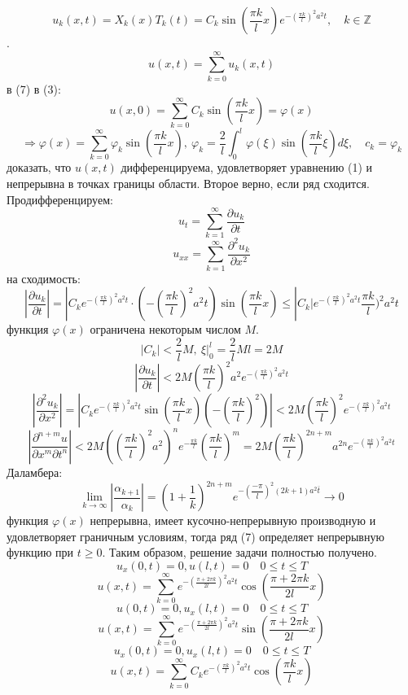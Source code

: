 \documentclass[9pt]{article}
\begin{document}
\[u_k(x,t)=X_k(x)T_k(t)=C_k\sin(\dfrac{\pi k}{l}x)e^{-(\frac{\pi k}{l})^2a^2t},\quad k\in\mathbb Z\].
\begin{equation}
    u(x,t)=\displaystyle\sum_{k=0}^\infty u_k(x,t)
\end{equation}
 в (7) в (3):
\[u(x,0)=\displaystyle\sum_{k=0}^\infty C_k\sin(\dfrac{\pi k}{l}x)=\varphi(x)\]
\[\Rightarrow\varphi(x)=\displaystyle\sum_{k=0}^\infty\varphi_k\sin(\dfrac{\pi k}{l}x),\ \varphi_k=\dfrac{2}{l}\int_0^l\varphi(\xi)\sin(\dfrac{\pi k}{l}\xi)d\xi,\quad c_k=\varphi_k\]
 доказать, что \(u(x,t)\) дифференцируема, удовлетворяет уравнению (1) и непрерывна в точках границы области. Второе верно, если ряд сходится. Продифференцируем: \[u_t=\displaystyle\sum_{k=1}^\infty \dfrac{\partial u_k}{\partial t}\]
\[u_{xx}=\displaystyle\sum_{k=1}^\infty \dfrac{\partial^2 u_k}{\partial x^2}\]
 на сходимость:
\[|\dfrac{\partial u_k}{\partial t}|=|C_ke^{-(\frac{\pi k}{l})^2a^2t}\cdot(-(\dfrac{\pi k}{l})^2a^2t)\sin(\dfrac{\pi k}{l}x)\le|C_k|e^{-(\frac{\pi k}{l})^2a^2t}\dfrac{\pi k}{l})^2a^2t\]
 функция \(\varphi(x)\) ограничена некоторым числом \(M\).
\[|C_k|<\dfrac{2}{l}M,\ \xi|_0^l=\dfrac{2}{l}Ml=2M\]
\[|\dfrac{\partial u_k}{\partial t}|<2M(\dfrac{\pi k}{l})^2a^2e^{-(\frac{\pi k}{l})^2a^2t}\]
\[|\dfrac{\partial^2u_k}{\partial x^2}|=|C_ke^{-(\frac{\pi k}{l})^2a^2t}\sin(\dfrac{\pi k}{l}x)(-(\dfrac{\pi k}{l})^2)|<2M(\dfrac{\pi k}{l})^2e^{-(\frac{\pi k}{l})^2a^2t}\]
\[|\dfrac{\partial^{n+m}u}{\partial x^m\partial t^n}|<2M((\dfrac{\pi k}{l})^2a^2)^ne^{-\frac{\pi k}{l}}(\dfrac{\pi k}{l})^m=2M(\dfrac{\pi k}{l})^{2n+m}a^{2n}e^{-(\frac{\pi k}{l})^2a^2t}\]
 Даламбера:
\[\displaystyle\lim_{k\to\infty}|\dfrac{\alpha_{k+1}}{\alpha_k}|=(1+\dfrac{1}{k})^{2n+m}e^{-(\dfrac{-\pi}{l})^2(2k+1)a^2\overline{t}}\to0\]
 функция \(\varphi(x)\) непрерывна, имеет кусочно-непрерывную производную и удовлетворяет граничным условиям, тогда ряд (7) определяет непрерывную функцию при \(t\ge0\). Таким образом, решение задачи полностью получено.
\begin{equation}
    u_x(0,t)=0,u(l,t)=0\quad0\le t\le T
\end{equation}
\begin{equation}
    u(x,t)=\sum_{k=0}^\infty e^{-(\frac{\pi +2\pi k}{2l})^2a^2t}\cos(\dfrac{\pi + 2\pi k}{2l}x)
\end{equation}
\begin{equation}
    u(0,t)=0,u_x(l,t)=0\quad0\le t\le T
\end{equation}
\begin{equation}
    u(x,t)=\sum_{k=0}^\infty e^{-(\frac{\pi +2\pi k}{2l})^2a^2t}\sin(\dfrac{\pi + 2\pi k}{2l}x)
\end{equation}
\begin{equation}
    u_x(0,t)=0,u_x(l,t)=0\quad0\le t\le T
\end{equation}
\begin{equation}
    u(x,t)=\sum_{k=0}^\infty C_ke^{-(\frac{\pi k}{l})^2a^2t}\cos(\dfrac{\pi k}{l}x)
\end{equation}
\end{document}
